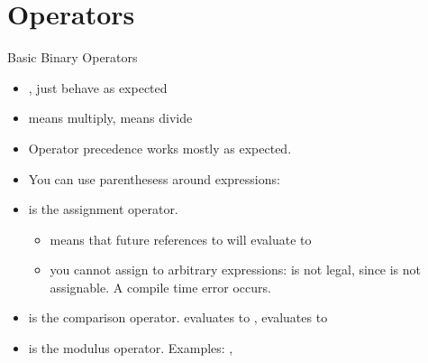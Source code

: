 \documentclass[10pt,graphics,aspectratio=169,table]{beamer}
\begin{document}
\section{Operators}
\begin{frame}[fragile]{Basic Binary Operators}
    \begin{itemize}
        \item \code{+}, \code{-} just behave as expected
        \item \code{*} means multiply, \code{/} means divide
        \item Operator precedence works mostly as expected.
        \item You can use parenthesess around expressions: 
        \item \code{=} is the assignment operator.
        \begin{itemize}
            \item
                 means that future references to 
                will evaluate to 
            \item
                you cannot assign to arbitrary expressions:
                 is not legal, since 
                is not assignable. A compile time error occurs.
        \end{itemize}
        \item \code{==} is the comparison operator.
             evaluates to ,
             evaluates to 
        \item
            \code{\%} is the modulus operator.
            Examples: , 
    \end{itemize}
\end{frame}
\end{document}

